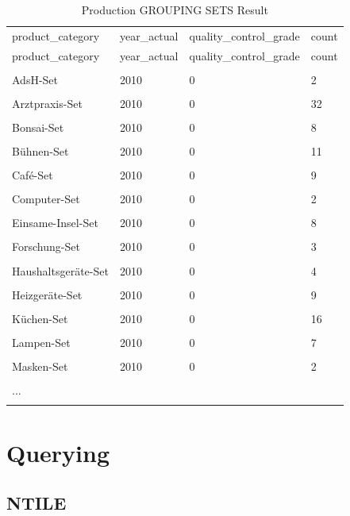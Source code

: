 \documentclass[letterpaper,12pt]{article}
\begin{document}
\begingroup
\renewcommand\arraystretch{0.5}
\begin{longtable}{p{4cm}p{4cm}p{4cm}p{4cm}}
        \caption{Production GROUPING SETS Result} \\
				product\_category & year\_actual & quality\_control\_grade & count
        \endfirsthead \\
        product\_category & year\_actual & quality\_control\_grade & count
        \endhead \\
				\hline \\
AdsH-Set & 2010 & 0 & 2 \\
\hline \\
Arztpraxis-Set & 2010 & 0 & 32 \\
\hline \\
Bonsai-Set & 2010 & 0 & 8 \\
\hline \\
Bühnen-Set & 2010 & 0 & 11 \\
\hline \\
Café-Set & 2010 & 0 & 9 \\
\hline \\
Computer-Set & 2010 & 0 & 2 \\
\hline \\
Einsame-Insel-Set & 2010 & 0 & 8 \\
\hline \\
Forschung-Set & 2010 & 0 & 3 \\
\hline \\
Haushaltsgeräte-Set & 2010 & 0 & 4 \\
\hline \\
Heizgeräte-Set & 2010 & 0 & 9 \\
\hline \\
Küchen-Set & 2010 & 0 & 16 \\
\hline \\
Lampen-Set & 2010 & 0 & 7 \\
\hline \\
Masken-Set & 2010 & 0 & 2 \\
\hline \\				
... & & & \\
\hline \\
\end{longtable} 
\endgroup  

\section{Querying}

\subsection{NTILE}
\end{document}
